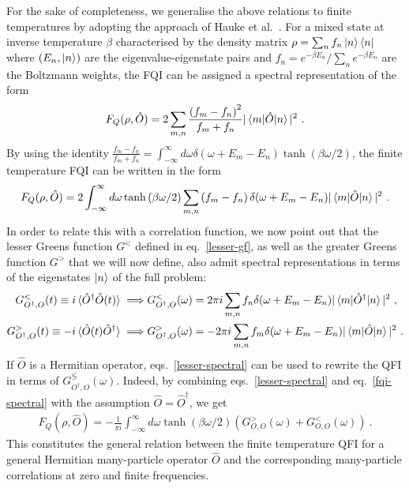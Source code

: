 \documentclass{iopart}
\begin{document}
For the sake of completeness, we generalise the above relations to finite temperatures by adopting the approach of Hauke et al.~\cite{Hauke2016}. For a mixed state at inverse temperature \(\beta\) characterised by the density matrix \(\rho = \sum_n f_n \ket{n}\bra{n}\) where \(\left(E_n,\ket{n}\right)\) are the eigenvalue-eigenstate pairs and \(f_n = e^{-\beta E_n}/\sum_n e^{-\beta E_n}\) are the Boltzmann weights, the FQI can be assigned a spectral representation of the form~\cite{Hauke2016}
\begin{eqnarray}
	F_Q(\rho, \hat O) = 2\sum_{m,n} \frac{\left(f_m - f_n\right)^2}{f_m + f_n}|\braket{m|\hat O|n}|^2~.
\end{eqnarray}
By using the identity \(\frac{f_m - f_n}{f_m + f_n} = \int_{-\infty}^\infty d\omega \delta(\omega + E_m - E_n)\tanh \left( \beta \omega/2 \right) \), the finite temperature FQI can be written in the form
\begin{eqnarray}\label{fqi-spectral}
	F_Q(\rho, \hat O) = 2\int_{-\infty}^\infty d\omega \tanh \left( \beta \omega/2 \right) \sum_{m,n} \left(f_m - f_n\right) \delta(\omega + E_m - E_n)|\braket{m|\hat O|n}|^2~.
\end{eqnarray}
In order to relate this with a correlation function, we now point out that the lesser Greens function \(G^<\) defined in eq.~\eqref{lesser-gf}, as well as the greater Greens function \(G^>\) that we will now define, also admit spectral representations in terms of the eigenstates \(\ket{n}\) of the full problem:
\begin{eqnarray}\label{lesser-spectral}
	G^<_{O^\dagger, O}(t) \equiv i\braket{\hat O^\dagger \hat O(t)} \implies & G^<_{O^\dagger, O}(\omega) = 2\pi i \sum_{m,n}f_n \delta(\omega + E_m - E_n) |\braket{m|\hat O^\dagger|n}|^2~,\\
	G^>_{O^\dagger, O}(t) \equiv -i\braket{\hat O(t) \hat O^\dagger} \implies & G^>_{O^\dagger, O}(\omega) = -2\pi i \sum_{m,n}f_m \delta(\omega + E_m - E_n) |\braket{m|\hat O|n}|^2~.
\end{eqnarray}
If \(\hat O\) is a Hermitian operator, eqs.~\eqref{lesser-spectral} can be used to rewrite the QFI in terms of \(G^\lessgtr_{O^\dagger, O}(\omega)\). Indeed, by combining eqs.~\eqref{lesser-spectral} and eq.~\eqref{fqi-spectral} with the assumption \(\hat O = \hat O^\dagger\), we get
\begin{eqnarray}
	F_Q(\rho, \hat O) = -\frac{1}{\pi i}\int_{-\infty}^\infty d\omega \tanh \left( \beta \omega/2 \right)\left(G^>_{O, O}(\omega) + G^<_{O, O}(\omega)\right)~. 
\end{eqnarray}
This constitutes the general relation between the finite temperature QFI for a general Hermitian many-particle operator \(\hat O\) and the corresponding many-particle correlations at zero and finite frequencies.
\end{document}
